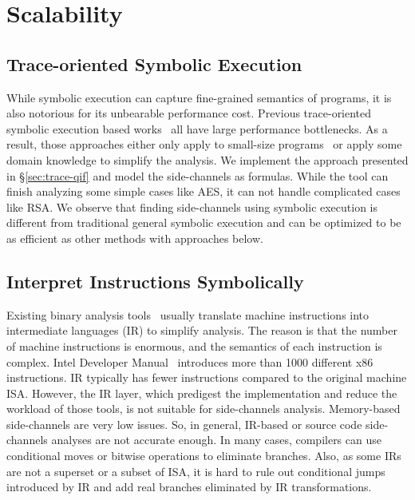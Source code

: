 \section{Scalability}
\subsection{Trace-oriented Symbolic Execution}
While symbolic execution can capture fine-grained semantics of programs, it
is also notorious for its unbearable performance cost. Previous trace-oriented
symbolic execution based
works~\cite{203878,Chattopadhyay:2017:QIL:3127041.3127044} all have large
performance bottlenecks. As a result, those approaches either only apply to
small-size programs~\cite{Chattopadhyay:2017:QIL:3127041.3127044} or apply some
domain knowledge to simplify the analysis. 
We implement the approach presented in \S\ref{sec:trace-qif} and model the side-channels as formulas. While the tool can finish analyzing some simple cases like AES, it can
not handle complicated cases like RSA.
We observe that finding side-channels using symbolic execution is different from
traditional general symbolic execution and can be optimized to be as efficient
as other methods with approaches below.

\subsection{Interpret Instructions Symbolically}
Existing binary analysis tools~\cite{shoshitaishvili2016state,
10.1007/978-3-642-22110-1_37} usually translate machine instructions into
intermediate languages (IR) to simplify analysis. 
The reason is that the number of machine instructions is
enormous, and the semantics of each instruction is complex. Intel Developer
Manual~\cite{intelsys} introduces more than 1000 different x86 instructions. 
IR typically has fewer instructions compared to the original machine ISA\@.
However, the IR layer, which predigest the implementation
and reduce the workload of those tools, is not suitable for side-channels 
analysis. Memory-based side-channels are very low issues. So, in general,
IR-based or source code side-channels analyses are not accurate enough.
In many cases, compilers can use conditional moves or bitwise operations to eliminate
branches. Also, as some IRs are not a superset or a subset of ISA, 
it is hard to rule out conditional jumps introduced by IR and add real branches 
eliminated by IR transformations.

